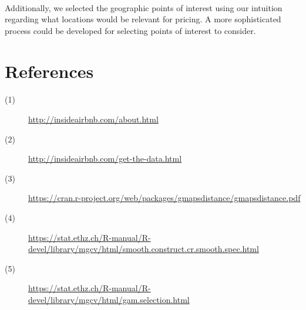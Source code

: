 \documentclass[11pt]{article}
\begin{document}
        \paragraph{}
        	Additionally, we selected the geographic points of interest using our intuition regarding what locations would be relevant for pricing. A more sophisticated process could be developed for selecting points of interest to consider.
    
    
    \pagebreak
    \section{References}
    
    \paragraph{}
    		\begin{description}
            	\item[(1)] \url{http://insideairbnb.com/about.html}
                \item[(2)] \url{http://insideairbnb.com/get-the-data.html}
                \item[(3)] \url{https://cran.r-project.org/web/packages/gmapsdistance/gmapsdistance.pdf}
                \item[(4)] \url{https://stat.ethz.ch/R-manual/R-devel/library/mgcv/html/smooth.construct.cr.smooth.spec.html}
                \item[(5)] \url{https://stat.ethz.ch/R-manual/R-devel/library/mgcv/html/gam.selection.html}
            \end{description}
    
    
\end{document}
